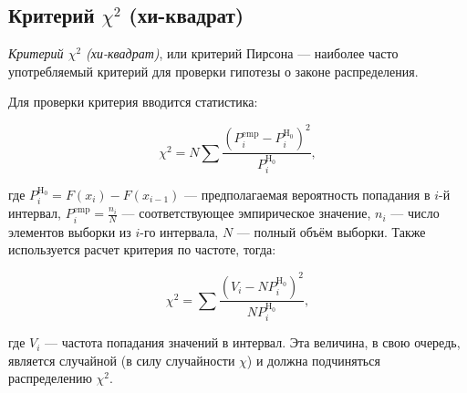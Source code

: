 \subsection{Критерий $\chi^2$ (хи-квадрат)}

\DEF\textit{Критерий $\chi^2$ (хи-квадрат)}, или критерий Пирсона — наиболее часто употребляемый критерий для проверки гипотезы о законе распределения.

Для проверки критерия вводится статистика:

    $$\chi^2 = N\sum \frac{\left( P_i^{\mathrm{emp}} - P_i^{\mathrm{H_{0}}} \right)^2}{P_i^{\mathrm{H_{0}}}},$$

где $P_i^{\mathrm{H_{0}}} = F(x_i) - F(x_{i-1})$ — предполагаемая вероятность попадания в $i$-й интервал, $P_i^{\mathrm{emp}} = \frac{n_i}{N}$ — соответствующее эмпирическое значение, ${n_i}$ — число элементов выборки из $i$-го интервала, $N$ — полный объём выборки. Также используется расчет критерия по частоте, тогда:

    $$\chi^2 = \sum \frac{\left( V_i^{\mathrm{}} - NP_i^{\mathrm{H_{0}}} \right)^2}{NP_i^{\mathrm{H_{0}}}},$$

где $V_i$ — частота попадания значений в интервал. Эта величина, в свою очередь, является случайной (в силу случайности $\chi$) и должна подчиняться распределению $\chi^2$.
